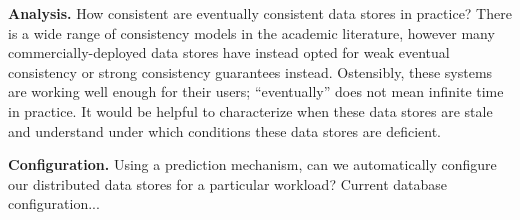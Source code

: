 \documentclass{vldb}
\begin{document}
\textbf{Analysis.} How consistent are eventually consistent data
stores in practice?  There is a wide range of consistency models in
the academic literature, however many commercially-deployed data
stores have instead opted for weak eventual consistency or strong
consistency guarantees instead.  Ostensibly, these systems are working
well enough for their users; ``eventually'' does not mean infinite
time in practice.  It would be helpful to characterize when these data
stores are stale and understand under which conditions these data
stores are deficient.

\textbf{Configuration.} Using a prediction mechanism, can we
automatically configure our distributed data stores for a particular
workload?  Current database configuration...

\end{document}
